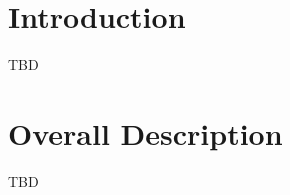 \documentclass{article}
\begin{document}
\section{Introduction}
TBD
\section{Overall Description}
TBD

\end{document}
